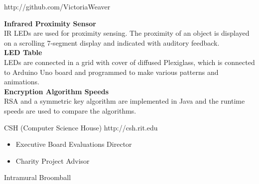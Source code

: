 \documentclass[9pt]{extbook} %
\begin{document}
	\hfill http://github.com/VictoriaWeaver\\
\begin{addmargin}[2cm]{0cm}
	\textbf{Infrared Proximity Sensor}\\
	IR LEDs are used for proximity sensing.  The proximity of an object is displayed on a scrolling 7-segment display and indicated with auditory feedback. \\

	\textbf{LED Table}\\
	LEDs are connected in a grid with cover of diffused Plexiglass, which is connected to Arduino Uno board and programmed to make various patterns and animations.\\

	\textbf{Encryption Algorithm Speeds}\\
	RSA and a symmetric key algorithm are implemented in Java and the runtime speeds are used to compare the algorithms.
\end{addmargin}

\bigskip


	\begin{addmargin}[2cm]{0cm}
		CSH (Computer Science House)	\hfill http://csh.rit.edu
		\begin{itemize}
			\item Executive Board Evaluations Director
			\item Charity Project Advisor
		\end{itemize}
		Intramural Broomball
	\end{addmargin}
	
\end{document}
